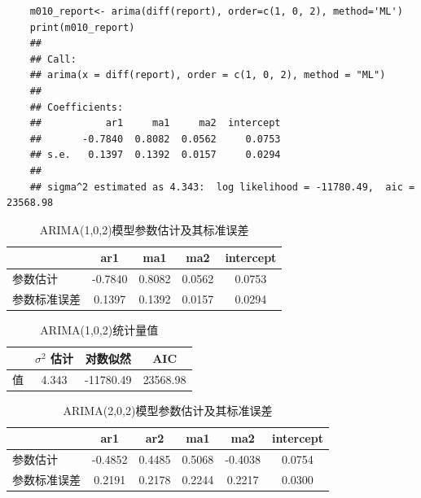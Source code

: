 \documentclass{article} %
\begin{document}

\begin{lstlisting}
    m010_report<- arima(diff(report), order=c(1, 0, 2), method='ML')
    print(m010_report)
    ## 
    ## Call:
    ## arima(x = diff(report), order = c(1, 0, 2), method = "ML")
    ## 
    ## Coefficients:
    ##           ar1     ma1     ma2  intercept
    ##       -0.7840  0.8082  0.0562     0.0753
    ## s.e.   0.1397  0.1392  0.0157     0.0294
    ## 
    ## sigma^2 estimated as 4.343:  log likelihood = -11780.49,  aic = 23568.98
\end{lstlisting}

\begin{table}[H]
    \centering
    \begin{tabular}{lcccc} %
    \toprule %
    & ar1 & ma1 & ma2 & intercept \\
    \midrule %
    参数估计 & -0.7840 & 0.8082 & 0.0562 & 0.0753 \\
    参数标准误差 & 0.1397 & 0.1392 & 0.0157 & 0.0294 \\
    \bottomrule %
    \end{tabular}
    \caption{ARIMA(1,0,2)模型参数估计及其标准误差}
    \label{tab:arima-param-estimates-transposed}
\end{table}

\begin{table}[H]
    \centering
    \begin{tabular}{lccc} %
    \toprule %
    & $\sigma^2$ 估计 & 对数似然 & AIC \\
    \midrule %
    值 & 4.343 & -11780.49 & 23568.98 \\
    \bottomrule %
    \end{tabular}
    \caption{ARIMA(1,0,2)统计量值}
    \label{tab:statistics-values-transposed}
\end{table}

\begin{table}[H]
    \centering
    \begin{tabular}{lccccc} %
    \toprule %
    & ar1 & ar2 & ma1 & ma2 & intercept \\
    \midrule %
    参数估计 & -0.4852 & 0.4485 & 0.5068 & -0.4038 & 0.0754 \\
    参数标准误差 & 0.2191 & 0.2178 & 0.2244 & 0.2217 & 0.0300 \\
    \bottomrule %
    \end{tabular}
    \caption{ARIMA(2,0,2)模型参数估计及其标准误差}
    \label{tab:arima-parameters-transposed}
\end{table}
\end{document}

